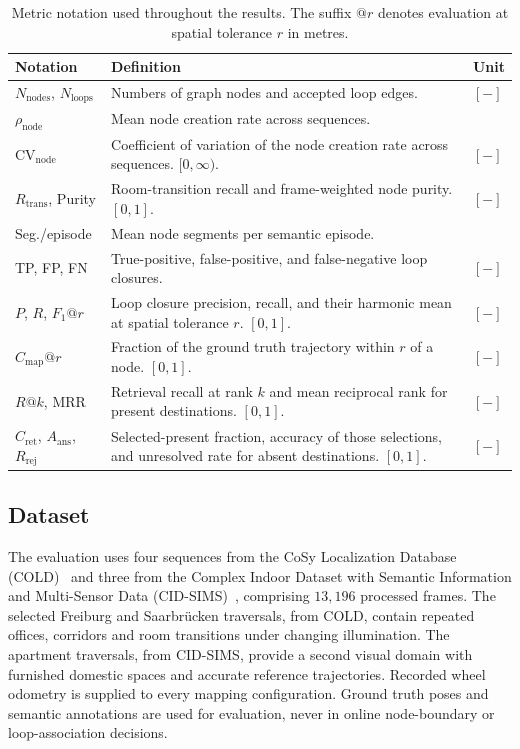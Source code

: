 \documentclass[5p,twocolumn,nonatbib,reversenotenum]{elsarticle}
\begin{document}
\begin{table}[t]
\centering
\caption{Metric notation used throughout the results. The suffix $@r$ denotes evaluation at spatial tolerance $r$ in metres.}

\label{tab:metrics}
\footnotesize
\setlength{\tabcolsep}{5pt}
\begin{tabular}{>{\raggedright\arraybackslash}p{}p{}>{\raggedright\arraybackslash}p{}}
\hline
Notation & Definition & Unit \\
\hline
$N_{\mathrm{nodes}}$, $N_{\mathrm{loops}}$ & Numbers of graph nodes and accepted loop edges. & $[-]$ \\
$\rho_{\mathrm{node}}$ & Mean node creation rate across sequences. & [nodes/1000 frames] \\
$\mathrm{CV}_{\mathrm{node}}$ & Coefficient of variation of the node creation rate across sequences. $[0,\infty)$. & $[-]$ \\
$R_{\mathrm{trans}}$, Purity & Room-transition recall and frame-weighted node purity. $[0,1]$. & $[-]$ \\
Seg./episode & Mean node segments per semantic episode. & [segments/episode] \\
TP, FP, FN & True-positive, false-positive, and false-negative loop closures. & $[-]$ \\
$P$, $R$, $F_1@r$ & Loop closure precision, recall, and their harmonic mean at spatial tolerance $r$. $[0,1]$. & $[-]$ \\
$C_{\mathrm{map}}@r$ & Fraction of the ground truth trajectory within $r$ of a node. $[0,1]$. & $[-]$ \\
$R@k$, MRR & Retrieval recall at rank $k$ and mean reciprocal rank for present destinations. $[0,1]$. & $[-]$ \\
$C_{\mathrm{ret}}$, $A_{\mathrm{ans}}$, $R_{\mathrm{rej}}$ & Selected-present fraction, accuracy of those selections, and unresolved rate for absent destinations. $[0,1]$. & $[-]$ \\
\hline
\end{tabular}
\end{table}

\subsection{Dataset}
The evaluation uses four sequences from the CoSy Localization Database (COLD)~\cite{COLD} and three from the Complex Indoor Dataset with Semantic Information and Multi-Sensor Data (CID-SIMS)~\cite{Zhang2023CIDSIMS}, comprising $13{,}196$ processed frames. The selected Freiburg and Saarbr\"ucken traversals, from COLD, contain repeated offices, corridors and room transitions under changing illumination. The apartment traversals, from CID-SIMS, provide a second visual domain with furnished domestic spaces and accurate reference trajectories. Recorded wheel odometry is supplied to every mapping configuration. Ground truth poses and semantic annotations are used for evaluation, never in online node-boundary or loop-association decisions.
\end{document}
